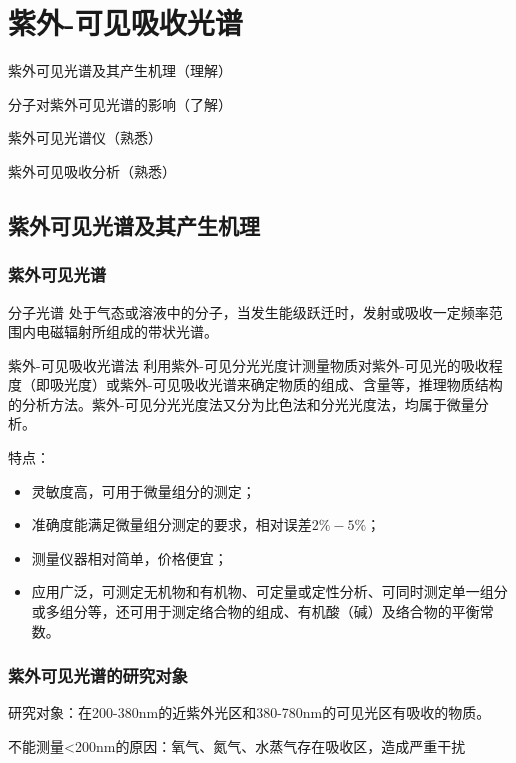 \chapter{紫外-可见吸收光谱}
\begin{introduction}
    \item 紫外可见光谱及其产生机理（理解）
    \item 分子对紫外可见光谱的影响（了解）
    \item 紫外可见光谱仪（熟悉）
    \item 紫外可见吸收分析（熟悉）
\end{introduction}
\section{紫外可见光谱及其产生机理}
\subsection{紫外可见光谱}
\begin{definition*}{分子光谱}
    处于气态或溶液中的分子，当发生能级跃迁时，发射或吸收一定频率范围内电磁辐射所组成的带状光谱。
\end{definition*}
\begin{definition*}{紫外-可见吸收光谱法}
    利用紫外-可见分光光度计测量物质对紫外-可见光的吸收程度（即吸光度）或紫外-可见吸收光谱来确定物质的组成、含量等，推理物质结构的分析方法。紫外-可见分光光度法又分为比色法和分光光度法，均属于微量分析。
\end{definition*}
特点：
\begin{itemize}
    \item 灵敏度高，可用于微量组分的测定；
    \item 准确度能满足微量组分测定的要求，相对误差$2\%-5\%$；
    \item 测量仪器相对简单，价格便宜；
    \item 应用广泛，可测定无机物和有机物、可定量或定性分析、可同时测定单一组分或多组分等，还可用于测定络合物的组成、有机酸（碱）及络合物的平衡常数。
\end{itemize}
\subsection{紫外可见光谱的研究对象}
研究对象：在200-380$\mathrm{nm}$的近紫外光区和380-780$\mathrm{nm}$的可见光区有吸收的物质。
\begin{note}
    不能测量<200$\mathrm{nm}$的原因：氧气、氮气、水蒸气存在吸收区，造成严重干扰
\end{note}
